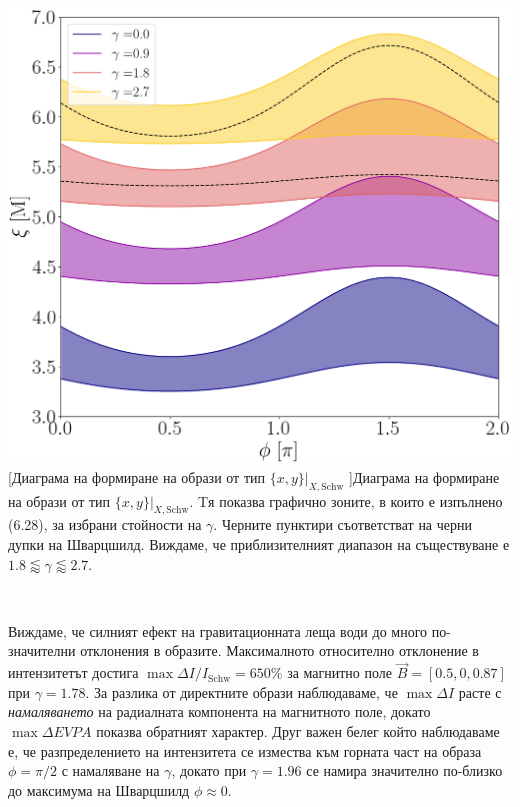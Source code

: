 \begin{minipage}{16em}
	\includegraphics[scale = 0.22]{WH_indirect_overlap_grapth.png}
	[Диаграма на формиране на образи от тип $\{x,y\}\vert_{X, \text{Schw}}$ ]{\small Диаграма на формиране на образи от тип $\{x,y\}\vert_{X, \text{Schw}}$. Tя показва графично зоните, в които е изпълнено (6.28), за избрани стойности на $\gamma$. Черните пунктири съответстват на черни дупки на Шварцшилд. Виждаме, че приблизителният диапазон на съществуване е $1.8 \lessapprox \gamma \lessapprox 2.7$.} 
	\label{WH_n1_overlap}
\end{minipage}\,\,
\begin{minipage}{20em}
	Виждаме, че силният ефект на гравитационната леща води до много по-значителни отклонения в образите. Максималното относително отклонение в интензитетът достига $\max \Delta I / I_{\text{Schw}} = 650\%$ за магнитно поле $\vec{B} = [0.5, 0, 0.87]$ при $\gamma = 1.78$. За разлика от директните образи наблюдаваме, че $\max\Delta I$ расте с \emph{намаляването} на радиалната компонента на магнитното поле, докато $\max\Delta EVPA$ показва обратният характер. Друг важен белег който наблюдаваме е, че разпределението на интензитета се измества към горната част на образа $\phi = \pi / 2$ с намаляване на $\gamma$, докато при $\gamma = 1.96$ се намира значително по-близко до максимума на Шварцшилд $\phi \approx 0 $.
\end{minipage}

